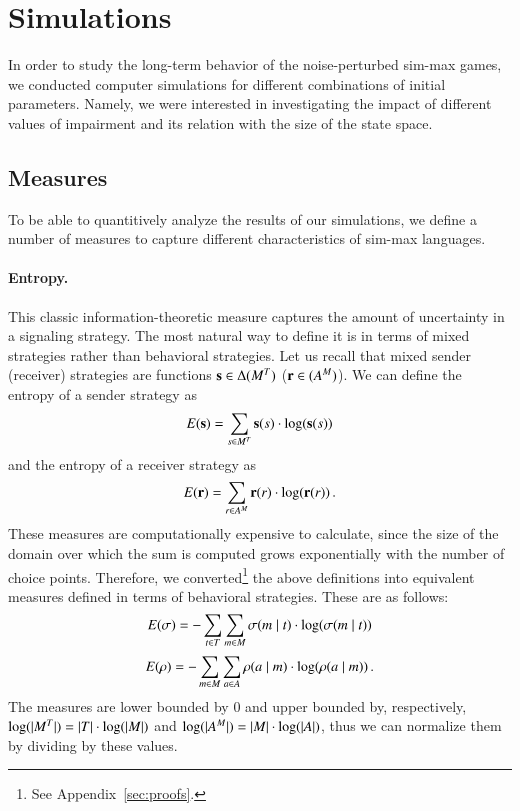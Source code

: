 \section{Simulations}

In order to study the long-term behavior of the noise-perturbed sim-max games, we conducted computer simulations for different combinations of initial parameters.
Namely, we were interested in investigating the impact of different values of impairment and its relation with the size of the state space.

\subsection{Measures}
\label{sec:measures}
To be able to quantitively analyze the results of our simulations, we define a number of measures to capture different characteristics of sim-max languages.

\paragraph{Entropy.}
This classic information-theoretic measure captures the amount of uncertainty in a signaling strategy.
The most natural way to define it is in terms of mixed strategies rather than behavioral strategies.
Let us recall that mixed sender (receiver) strategies are functions $\mathrm{\mathbf{s}} \in \Delta(M^T)$ ($\mathrm{\mathbf{r}} \in (A^M)$).
We can define the entropy of a sender strategy as
\begin{align*}
  E(\mathrm{\mathbf{s}}) = \sum_{s \in M^T} \mathrm{\mathbf{s}}(s) \cdot \log(\mathrm{\mathbf{s}}(s))
\end{align*} 
and the entropy of a receiver strategy as
\begin{align*}
  E(\mathrm{\mathbf{r}}) = \sum_{r \in A^M} \mathrm{\mathbf{r}}(r) \cdot \log(\mathrm{\mathbf{r}}(r)) \,.
\end{align*} 
These measures are computationally expensive to calculate, since the size of the domain over which the sum is computed grows exponentially with the number of choice points.
Therefore, we converted\footnote{See Appendix~\ref{sec:proofs}.} the above definitions into equivalent measures defined in terms of behavioral strategies.
These are as follows:
\begin{align*}
  E(\sigma) = -\sum_{t \in T} \sum_{m \in M} \sigma(m \mid t) \cdot \log(\sigma(m \mid t))
\end{align*} 
\begin{align*}
  E(\rho) = -\sum_{m \in M} \sum_{a \in A} \rho(a \mid m) \cdot \log(\rho(a \mid m)) \,.
\end{align*}
The measures are lower bounded by $0$ and upper bounded by, respectively, $\log(|M^T|) = |T| \cdot \log(|M|)$ and $\log(|A^M|) = |M| \cdot \log(|A|)$, thus we can normalize them by dividing by these values.

